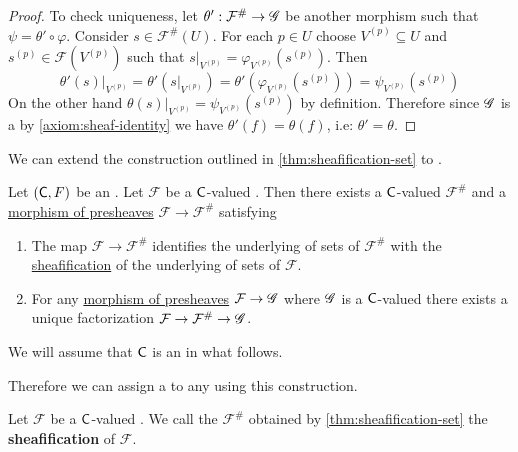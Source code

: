 \documentclass[../main.tex]{subfiles}
\begin{document}
\begin{proof}
  To check uniqueness, let \(\theta': \mathcal{F}^{\#} \to \mathscr{G}\) be another morphism such that \(\psi = \theta' \circ \varphi\).
  Consider \(s \in \mathcal{F}^{\#}(U)\). For each \(p \in U\) choose \(V^{(p)} \subseteq U\) and \(s^{(p)} \in \mathcal{F}(V^{(p)})\) such that \(s|_{V^{(p)}} = \varphi_{V^{(p)}}(s^{(p)})\).
  Then
  \begin{equation*}
    \theta'(s)|_{V^{(p)}} = \theta'(s|_{V^{(p)}}) = \theta'(\varphi_{V^{(p)}}(s^{(p)})) = \psi_{V^{(p)}}(s^{(p)})
  \end{equation*}
  On the other hand \(\theta(s)|_{V^{(p)}} = \psi_{V^{(p)}}(s^{(p)})\) by definition.
  Therefore since \(\mathscr{G}\) is a  by \ref{axiom:sheaf-identity} we have \(\theta'(f) = \theta(f)\), i.e: \(\theta' = \theta\).
\end{proof}

We can extend the construction outlined in \autoref{thm:sheafification-set} to .
\begin{lemma}
  Let \((\mathsf{C}, F)\) be an . Let \(\mathcal{F}\) be a \(\mathsf{C}\)-valued .
  Then there exists a \(\mathsf{C}\)-valued  \(\mathcal{F}^{\#}\) and a \hyperref[def:presheaf]{morphism of presheaves} \(\mathcal{F} \to \mathcal{F}^{\#}\) satisfying
  \begin{enumerate}
    \item The map \(\mathcal{F} \to \mathcal{F}^{\#}\) identifies the underlying  of sets of \(\mathcal{F}^{\#}\) with the \hyperref[thm:sheafification-set]{sheafification} of the underlying  of sets of \(\mathcal{F}\).
    \item For any \hyperref[def:presheaf]{morphism of presheaves} \(\mathcal{F} \to \mathscr{G}\) where \(\mathscr{G}\) is a \(\mathsf{C}\)-valued  there exists a unique factorization \(\mathcal{F} \to \mathcal{F}^{\#} \to \mathscr{G}\).
  \end{enumerate}
\end{lemma}

\begin{remark}
  We will assume that \(\mathsf{C}\) is an  in what follows.
\end{remark}

Therefore we can assign a  to any  using this construction.
\begin{definition}[Sheafification] \label{def:sheafification}
  Let \(\mathcal{F}\) be a \(\mathsf{C}\)-valued .
  We call the  \(\mathcal{F}^{\#}\) obtained by \autoref{thm:sheafification-set} the \textbf{sheafification} of \(\mathcal{F}\).
\end{definition}
\end{document}
